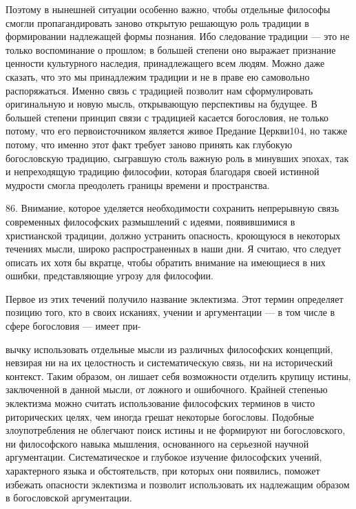 \documentclass[a5paper,10pt]{article}
\begin{document}
Поэтому в нынешней ситуации особенно важно, чтобы отдельные философы смогли
пропагандировать заново открытую решающую роль традиции в формировании
надлежащей формы познания. Ибо следование традиции — это не только воспоминание
о прошлом; в большей степени оно выражает признание ценности культурного
наследия, принадлежащего всем людям. Можно даже сказать, что это мы принадлежим
традиции и не в праве ею самовольно распоряжаться. Именно связь с традицией
позволит нам сформулировать оригинальную и новую мысль, открывающую перспективы
на будущее. В большей степени принцип связи с традицией касается богословия, не
только потому, что его первоисточником является живое Предание Церкви104, но
также потому, что именно этот факт требует заново принять как глубокую
богословскую традицию, сыгравшую столь важную роль в минувших эпохах, так и
непреходящую традицию философии, которая благодаря своей истинной мудрости
смогла преодолеть границы времени и пространства.

86. Внимание, которое уделяется необходимости сохранить непрерывную связь
современных философских размышлений с идеями, появившимися в христианской
традиции, должно устранить опасность, кроющуюся в некоторых течениях мысли,
широко распространенных в наши дни. Я считаю, что следует описать их хотя бы
вкратце, чтобы обратить внимание на имеющиеся в них ошибки, представляющие
угрозу для философии.

Первое из этих течений получило название эклектизма. Этот термин определяет
позицию того, кто в своих исканиях, учении и аргументации — в том числе в сфере
богословия — имеет при-

вычку использовать отдельные мысли из различных философских концепций, невзирая
ни на их целостность и систематическую связь, ни на исторический контекст.
Таким образом, он лишает себя возможности отделить крупицу истины, заключенной
в данной мысли, от ложного и ошибочного. Крайней степенью эклектизма можно
считать использование философских терминов в чисто риторических целях, чем
иногда грешат некоторые богословы. Подобные злоупотребления не облегчают поиск
истины и не формируют ни богословского, ни философского навыка мышления,
основанного на серьезной научной аргументации. Систематическое и глубокое
изучение философских учений, характерного языка и обстоятельств, при которых
они появились, поможет избежать опасности эклектизма и позволит использовать их
надлежащим образом в богословской аргументации.
\end{document}
